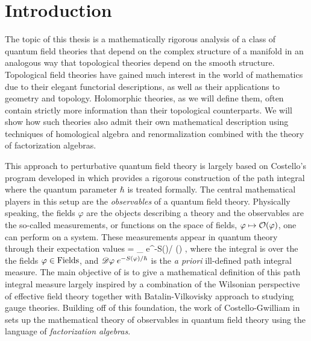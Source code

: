 \chapter{Introduction}

The topic of this thesis is a mathematically rigorous analysis of a class of quantum field theories that depend on the complex structure of a manifold in an analogous way that topological theories depend on the smooth structure. 
Topological field theories have gained much interest in the world of mathematics due to their elegant functorial descriptions, as well as their applications to geometry and topology. 
Holomorphic theories, as we will define them, often contain strictly more information than their topological counterparts.
We will show how such theories also admit their own mathematical description using techniques of homological algebra and renormalization combined with the theory of factorization algebras. 

This approach to perturbative quantum field theory is largely based on Costello's program developed in \cite{CostelloRenormalization} which provides a rigorous construction of the path integral where the quantum parameter $\hbar$ is treated formally. 
The central mathematical players in this setup are the {\em observables} of a quantum field theory. 
Physically speaking, the fields $\varphi$ are the objects describing a theory and the observables are the so-called measurements, or functions on the space of fields, $\varphi \mapsto \mathcal O(\varphi)$, one can perform on a system.
These measurements appear in quantum theory through their expectation values
\ben
\<\cO\> = \int_{\varphi {}} \sD \varphi \; e^{-S(\varphi)/ \hbar} \;  \cO(\varphi) ,
\een
where the integral is over the the fields $\varphi \in {\rm Fields}$, and $\mathscr D \varphi \; e^{-S(\varphi)/ \hbar}$ is the {\em a priori} ill-defined path integral measure.
The main objective of \cite{CostelloRenormalization} is to give a mathematical definition of this path integral measure largely inspired by a combination of the Wilsonian perspective of effective field theory together with Batalin-Vilkovisky approach to studying gauge theories.
Building off of this foundation, the work of Costello-Gwilliam in \cite{CG1,CG2} sets up the mathematical theory of observables in quantum field theory using the language of {\em factorization algebras}. 

